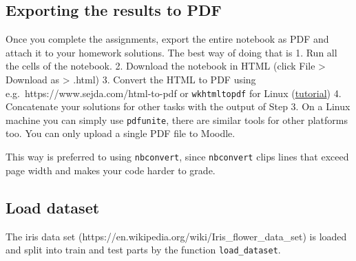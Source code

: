 \documentclass[11pt]{article}
\begin{document}
    \hypertarget{exporting-the-results-to-pdf}{%
\subsection{Exporting the results to
PDF}\label{exporting-the-results-to-pdf}}

Once you complete the assignments, export the entire notebook as PDF and
attach it to your homework solutions. The best way of doing that is 1.
Run all the cells of the notebook. 2. Download the notebook in HTML
(click File \textgreater{} Download as \textgreater{} .html) 3. Convert
the HTML to PDF using e.g.~https://www.sejda.com/html-to-pdf or
\texttt{wkhtmltopdf} for Linux
(\href{https://www.cyberciti.biz/open-source/html-to-pdf-freeware-linux-osx-windows-software/}{tutorial})
4. Concatenate your solutions for other tasks with the output of Step 3.
On a Linux machine you can simply use \texttt{pdfunite}, there are
similar tools for other platforms too. You can only upload a single PDF
file to Moodle.

This way is preferred to using \texttt{nbconvert}, since
\texttt{nbconvert} clips lines that exceed page width and makes your
code harder to grade.

    \hypertarget{load-dataset}{%
\subsection{Load dataset}\label{load-dataset}}

The iris data set
(https://en.wikipedia.org/wiki/Iris\_flower\_data\_set) is loaded and
split into train and test parts by the function \texttt{load\_dataset}.
\end{document}
